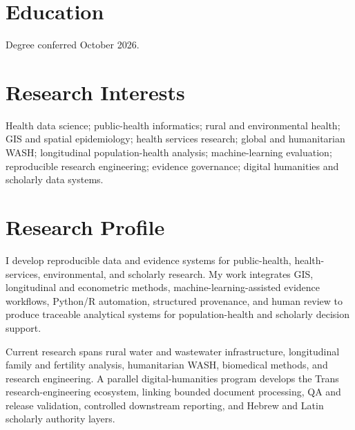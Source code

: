 \documentclass[10.5pt,letterpaper]{article}
\begin{document}

\section*{Education}
{\small Degree conferred October 2026.}\\[-1pt]

\section*{Research Interests}
Health data science; public-health informatics; rural and environmental health; GIS and spatial epidemiology; health services research; global and humanitarian WASH; longitudinal population-health analysis; machine-learning evaluation; reproducible research engineering; evidence governance; digital humanities and scholarly data systems.

\section*{Research Profile}
I develop reproducible data and evidence systems for public-health, health-services, environmental, and scholarly research. My work integrates GIS, longitudinal and econometric methods, machine-learning-assisted evidence workflows, Python/R automation, structured provenance, and human review to produce traceable analytical systems for population-health and scholarly decision support.

Current research spans rural water and wastewater infrastructure, longitudinal family and fertility analysis, humanitarian WASH, biomedical methods, and research engineering. A parallel digital-humanities program develops the Trans research-engineering ecosystem, linking bounded document processing, QA and release validation, controlled downstream reporting, and Hebrew and Latin scholarly authority layers.
\end{document}
